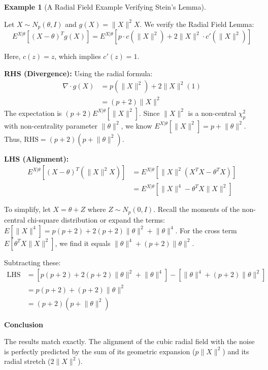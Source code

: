 \documentclass[
  letterpaper,
  DIV=11,
  numbers=noendperiod]{scrreprt}
\renewcommand{\[}{\begin{equation}}
\renewcommand{\]}{\end{equation}}
\theoremstyle{definition}
\theoremstyle{plain}
\theoremstyle{plain}
\theoremstyle{plain}
\theoremstyle{definition}
\newtheorem{example}{Example}[chapter]
\theoremstyle{plain}
\theoremstyle{remark}
\begin{document}
\begin{example}[A Radial Field Example Verifying Stein's
Lemma]\protect\hypertarget{exm-stein-radial}{}\label{exm-stein-radial}

Let \(X \sim N_p(\theta, I)\) and \(g(X) = \lVert X \rVert^2 X\). We
verify the Radial Field Lemma:
\[E^{X|\theta} \left[ (X - \theta)^T g(X) \right] = E^{X|\theta} \left[ p \cdot c(\lVert X \rVert^2) + 2 \lVert X \rVert^2 \cdot c'(\lVert X \rVert^2) \right]\]

Here, \(c(z) = z\), which implies \(c'(z) = 1\).

\textbf{RHS (Divergence):} Using the radial formula: \[
\begin{aligned}
\nabla \cdot g(X) &= p(\lVert X \rVert^2) + 2\lVert X \rVert^2(1) \\
&= (p+2)\lVert X \rVert^2
\end{aligned}
\] The expectation is \((p+2)E^{X|\theta}[\lVert X \rVert^2]\). Since
\(\lVert X \rVert^2\) is a non-central \(\chi^2_p\) with non-centrality
parameter \(\lVert \theta \rVert^2\), we know
\(E^{X|\theta}[\lVert X \rVert^2] = p + \lVert \theta \rVert^2\). Thus,
\(\text{RHS} = (p+2)(p + \lVert \theta \rVert^2)\).

\textbf{LHS (Alignment):} \[
\begin{aligned}
E^{X|\theta} \left[ (X-\theta)^T (\lVert X \rVert^2 X) \right] &= E^{X|\theta} \left[ \lVert X \rVert^2 (X^T X - \theta^T X) \right] \\
&= E^{X|\theta} \left[ \lVert X \rVert^4 - \theta^T X \lVert X \rVert^2 \right]
\end{aligned}
\]

To simplify, let \(X = \theta + Z\) where \(Z \sim N_p(0, I)\). Recall
the moments of the non-central chi-square distribution or expand the
terms:
\(E[\lVert X \rVert^4] = p(p+2) + 2(p+2)\lVert \theta \rVert^2 + \lVert \theta \rVert^4\).
For the cross term \(E[\theta^T X \lVert X \rVert^2]\), we find it
equals \(\lVert \theta \rVert^4 + (p+2)\lVert \theta \rVert^2\).

Subtracting these: \[
\begin{aligned}
\text{LHS} &= [p(p+2) + 2(p+2)\lVert \theta \rVert^2 + \lVert \theta \rVert^4] - [\lVert \theta \rVert^4 + (p+2)\lVert \theta \rVert^2] \\
&= p(p+2) + (p+2)\lVert \theta \rVert^2 \\
&= (p+2)(p + \lVert \theta \rVert^2)
\end{aligned}
\]

\textbf{Conclusion}

The results match exactly. The alignment of the cubic radial field with
the noise is perfectly predicted by the sum of its geometric expansion
(\(p \lVert X \rVert^2\)) and its radial stretch
(\(2 \lVert X \rVert^2\)).

\end{example}
\end{document}
